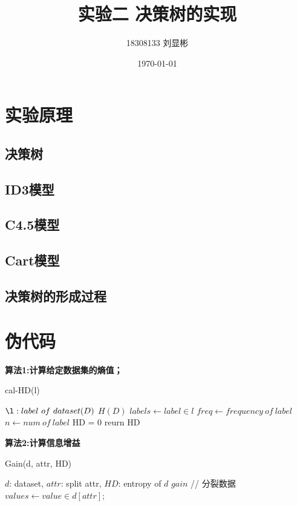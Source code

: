 \documentclass[11pt]{article}
\title{实验二 决策树的实现}
\author{18308133 刘显彬}
\date{\today}
\begin{document}
\begin{CJK}{UTF8}{gbsn}
\maketitle
\section{实验原理}
\subsection{决策树}
\subsection{ID3模型}
\subsection{C4.5模型}
\subsection{Cart模型}
\subsection{决策树的形成过程}
\section{伪代码}
\textbf{算法1:计算给定数据集的熵值；}
\begin{algorithm}
\caption{cal-HD(l)}
\label{alg1}
\begin{algorithmic}
\REQUIRE $\l: label\ of \ dataset(D)$
\ENSURE $H(D)$
\STATE $labels \gets label \in l$
\STATE $freq \gets frequency\ of\ label$
\STATE $n \gets num\ of \ label$
\STATE HD = 0
\ENDFOR
\STATE reurn HD

\end{algorithmic}
	
\end{algorithm}

\textbf{算法2:计算信息增益}
\begin{algorithm}

\caption{Gain(d, attr, HD)}\label{alg2}
\begin{algorithmic}
\REQUIRE $d$: dataset, $attr$: split attr, $HD$: entropy of $d$
\ENSURE $gain$
\STATE // 分裂数据
\STATE $values \gets value \in d[attr]$;



\end{algorithmic}
\end{algorithm}
\end{CJK}
\end{document}
